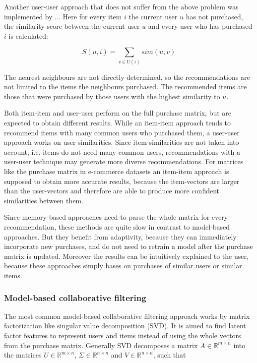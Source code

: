 \documentclass[10pt]{reportMaster}
\begin{document}
Another user-user approach that does not suffer from the above problem was implemented by ... %
Here for every item $i$ the current user $u$ has not purchased, the similarity score between the current user $u$ and every user who has purchased $i$ is calculated: 

\begin{equation}
	S(u,i) = \sum_{v \in U(i)}{sim(u,v)}
\end{equation}

The nearest neighbours are not directly determined, so the recommendations are not limited to the items the neighbours purchased.
The recommended items are those that were purchased by those users with the highest similarity to $u$.

Both item-item and user-user perform on the full purchase matrix, but are expected to obtain different results.
While an item-item approach tends to recommend items with many common users who purchased them, a user-user approach works on user similarities.
Since item-similarities are not taken into account, i.e. items do not need many common users, recommendations with a user-user technique may generate more diverse recommendations.
For matrices like the purchase matrix in e-commerce datasets an item-item approach is supposed to obtain more accurate results, because the item-vectors are larger than the user-vectors and therefore are able to produce more confident similarities between them. 

Since memory-based approaches need to parse the whole matrix for every recommendation, these methods are quite slow in contrast to model-based approaches.
But they benefit from adaptivity, because they can immediately incorporate new purchases, and do not need to retrain a model after the purchase matrix is updated.
Moreover the results can be intuitively explained to the user, because these approaches simply bases on purchases of similar users or similar items.

\subsubsection{Model-based collaborative filtering}
\label{sec:modelBasedCF}
The most common model-based collaborative filtering approach works by matrix factorization like singular value decomposition (SVD).
It is aimed to find latent factor features to represent users and items instead of using the whole vectors from the purchase matrix.
Generally SVD decomposes a matrix $A \in \mathds{R}^{m \times n}$ into the matrices $U \in \mathds{R}^{m \times n}$, $\Sigma \in \mathds{R}^{n \times n}$ and $V \in \mathds{R}^{n \times n}$, such that 
\end{document}
